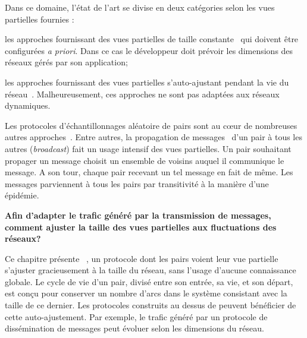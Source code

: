 
Dans ce domaine, l'état de l'art se divise en deux catégories selon les vues
partielles fournies :
\begin{inparaenum}[(i)]
\item les approches fournissant des vues partielles de taille
  constante~\cite{eugster2003lightweight, leitao2007dependable,
    tolgyeski2009adaptive, voulgaris2005cyclon} qui doivent être configurées
  \emph{a priori}. Dans ce cas le développeur doit prévoir les dimensions des
  réseaux gérés par son application;
\item les approches fournissant des vues partielles s'auto-ajustant pendant la
  vie du réseau~\cite{ganesh2001scamp, ganesh2003peer}. Malheureusement, ces
  approches ne sont pas adaptées aux réseaux dynamiques.
\end{inparaenum}

Les protocoles d'échantillonnages aléatoire de pairs sont au cœur de nombreuses
autres approches~\cite{folz2016cyclades, jelasity2009tman,
  krasikova2016distributed, voulgaris2013vicinity}. Entre autres, la propagation
de messages~\cite{birman1999bimodal, kermarrec2003probabilistic} d'un pair à
tous les autres (\emph{broadcast}) fait un usage intensif des vues
partielles. Un pair souhaitant propager un message choisit un ensemble de
voisins auquel il communique le message. A son tour, chaque pair recevant un tel
message en fait de même. Les messages parviennent à tous les pairs par
transitivité à la manière d'une épidémie.

\textbf{Afin d'adapter le trafic généré par la transmission de messages, comment
  ajuster la taille des vues partielles aux fluctuations des réseaux?}

Ce chapitre présente \SPRAY~\cite{nedelec2015spray}, un protocole dont les pairs
voient leur vue partielle s'ajuster gracieusement à la taille du réseau, sans
l'usage d'aucune connaissance globale. Le cycle de vie d'un pair, divisé entre
son entrée, sa vie, et son départ, est conçu pour conserver un nombre d'arcs
dans le système consistant avec la taille de ce dernier. Les protocoles
construits au dessus de \SPRAY peuvent bénéficier de cette auto-ajustement. Par
exemple, le trafic généré par un protocole de dissémination de messages peut
évoluer selon les dimensions du réseau.

